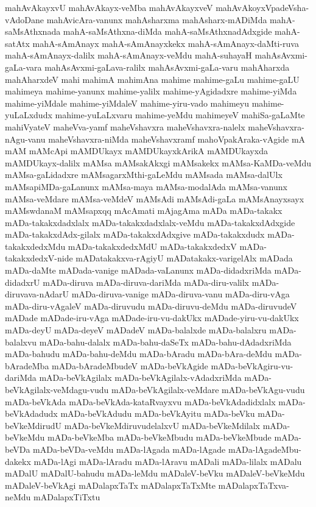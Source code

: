 {mahAvAkayxvU
mahAvAkayx-veMba
mahAvAkayxveV
mahAvAkoyxVpadeVsha-vAdoDane
mahAvicAra-vanunx
mahAsharxma
mahAsharx-mADiMda
mahA-saMsAthxnada
mahA-saMsAthxna-diMda
mahA-saMsAthxnadAdxgide
mahA-satAtx
mahA-sAmAnayx
mahA-sAmAnayxkekx
mahA-sAmAnayx-daMti-ruva
mahA-sAmAnayx-dalilx
mahA-sAmAnayx-veMdu
mahA-suhayaH
mahAsAvxmi-gaLa-vara
mahAsAvxmi-gaLava-ralilx
mahAsAvxmi-gaLa-varu
mahAharxda
mahAharxdeV
mahi
mahimA
mahimAna
mahime
mahime-gaLu
mahime-gaLU
mahimeya
mahime-yanunx
mahime-yalilx
mahime-yAgidadxre
mahime-yiMda
mahime-yiMdale
mahime-yiMdaleV
mahime-yiru-vado
mahimeyu
mahime-yuLaLxdudx
mahime-yuLaLxvaru
mahime-yeMdu
mahimeyeV
mahiSa-gaLaMte
mahiVyateV
maheVva-yamf
maheVshavxra
maheVshavxra-nalelx
maheVshavxra-nAgu-vanu
maheVshavxra-niMda
maheVshavxramf
mahoVpakAraka-vAgide
mA
mAM
mAMcApi
mAMDUkayx
mAMDUkayxkArikA
mAMDUkayxda
mAMDUkayx-dalilx
mAMsa
mAMsakAkxgi
mAMsakekx
mAMsa-KaMDa-veMdu
mAMsa-gaLidadxre
mAMsagarxMthi-gaLeMdu
mAMsada
mAMsa-dalUlx
mAMsapiMDa-gaLanunx
mAMsa-maya
mAMsa-modalAda
mAMsa-vanunx
mAMsa-veMdare
mAMsa-veMdeV
mAMsAdi
mAMsAdi-gaLa
mAMsAnayxsayx
mAMswdanaM
mAMsapxqq
mAcAmati
mAjagAma
mADa
mADa-takakx
mADa-takakxdadxlalx
mADa-takakxdadxlalx-veMdu
mADa-takakxdAdxgide
mADa-takakxdAdx-gilalx
mADa-takakxdAdxgive
mADa-takakxdudx
mADa-takakxdedxMdu
mADa-takakxdedxMdU
mADa-takakxdedxV
mADa-takakxdedxV-nide
mADatakakxva-rAgiyU
mADatakakx-varigelAlx
mADada
mADa-daMte
mADada-vanige
mADada-vaLanunx
mADa-didadxriMda
mADa-didadxrU
mADa-diruva
mADa-diruva-dariMda
mADa-diru-valilx
mADa-diruvava-nAdarU
mADa-diruva-vanige
mADa-diruva-vanu
mADa-diru-vAga
mADa-diru-vAgaleV
mADa-diruvudu
mADa-diruvu-deMdu
mADa-diruvudeV
mADade
mADade-iru-vAga
mADade-iru-vu-dakUkx
mADade-yiru-vu-dakUkx
mADa-deyU
mADa-deyeV
mADadeV
mADa-balalxde
mADa-balalxru
mADa-balalxvu
mADa-bahu-dalalx
mADa-bahu-daSeTx
mADa-bahu-dAdadxriMda
mADa-bahudu
mADa-bahu-deMdu
mADa-bAradu
mADa-bAra-deMdu
mADa-bAradeMba
mADa-bAradeMbudeV
mADa-beVkAgide
mADa-beVkAgiru-vu-dariMda
mADa-beVkAgilalx
mADa-beVkAgilalx-vAdadxriMda
mADa-beVkAgilalx-veMdagu-vudu
mADa-beVkAgilalx-veMdare
mADa-beVkAgu-vudu
mADa-beVkAda
mADa-beVkAda-kataRvayxvu
mADa-beVkAdadidxlalx
mADa-beVkAdadudx
mADa-beVkAdudu
mADa-beVkAyitu
mADa-beVku
mADa-beVkeMdirudU
mADa-beVkeMdiruvudelalxvU
mADa-beVkeMdilalx
mADa-beVkeMdu
mADa-beVkeMba
mADa-beVkeMbudu
mADa-beVkeMbude
mADa-beVDa
mADa-beVDa-veMdu
mADa-lAgada
mADa-lAgade
mADa-lAgadeMbu-dakekx
mADa-lAgi
mADa-lAradu
mADa-lAravu
mADali
mADa-lilalx
mADalu
mADalU
mADalU-bahudu
mADa-leMdu
mADaleV-beVku
mADaleV-beVkeMdu
mADaleV-beVkAgi
mADalapxTaTx
mADalapxTaTxMte
mADalapxTaTxva-neMdu
mADalapxTiTxtu
}
